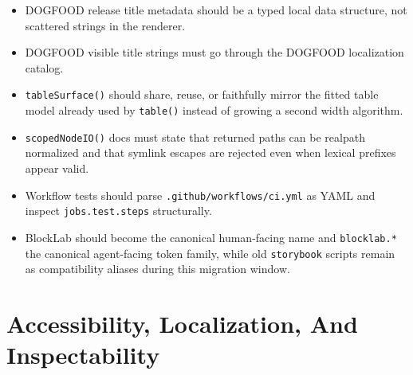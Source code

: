 \begin{itemize}
\tightlist
\item
  DOGFOOD release title metadata should be a typed local data structure, not scattered strings in the renderer.
\item
  DOGFOOD visible title strings must go through the DOGFOOD localization catalog.
\item
  \texttt{t\allowbreak{}a\allowbreak{}b\allowbreak{}l\allowbreak{}e\allowbreak{}S\allowbreak{}u\allowbreak{}r\allowbreak{}f\allowbreak{}a\allowbreak{}c\allowbreak{}e\allowbreak{}(\allowbreak{})} should share, reuse, or faithfully mirror the fitted table model already used by \texttt{t\allowbreak{}a\allowbreak{}b\allowbreak{}l\allowbreak{}e\allowbreak{}(\allowbreak{})} instead of growing a second width algorithm.
\item
  \texttt{s\allowbreak{}c\allowbreak{}o\allowbreak{}p\allowbreak{}e\allowbreak{}d\allowbreak{}N\allowbreak{}o\allowbreak{}d\allowbreak{}e\allowbreak{}I\allowbreak{}O\allowbreak{}(\allowbreak{})} docs must state that returned paths can be realpath normalized and that symlink escapes are rejected even when lexical prefixes appear valid.
\item
  Workflow tests should parse \texttt{.\allowbreak{}g\allowbreak{}i\allowbreak{}t\allowbreak{}h\allowbreak{}u\allowbreak{}b\allowbreak{}/\allowbreak{}w\allowbreak{}o\allowbreak{}r\allowbreak{}k\allowbreak{}f\allowbreak{}l\allowbreak{}o\allowbreak{}w\allowbreak{}s\allowbreak{}/\allowbreak{}c\allowbreak{}i\allowbreak{}.\allowbreak{}y\allowbreak{}m\allowbreak{}l} as YAML and inspect \texttt{j\allowbreak{}o\allowbreak{}b\allowbreak{}s\allowbreak{}.\allowbreak{}t\allowbreak{}e\allowbreak{}s\allowbreak{}t\allowbreak{}.\allowbreak{}s\allowbreak{}t\allowbreak{}e\allowbreak{}p\allowbreak{}s} structurally.
\item
  BlockLab should become the canonical human-facing name and \texttt{b\allowbreak{}l\allowbreak{}o\allowbreak{}c\allowbreak{}k\allowbreak{}l\allowbreak{}a\allowbreak{}b\allowbreak{}.\allowbreak{}*} the canonical agent-facing token family, while old \texttt{s\allowbreak{}t\allowbreak{}o\allowbreak{}r\allowbreak{}y\allowbreak{}b\allowbreak{}o\allowbreak{}o\allowbreak{}k} scripts remain as compatibility aliases during this migration window.
\end{itemize}

\section{Accessibility, Localization, And Inspectability}\label{record-101-accessibility-localization-and-inspectability}

